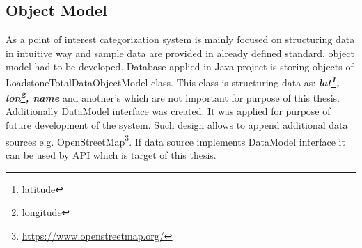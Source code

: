 \subsection{Object Model}
As a point of interest categorization system is mainly focused on structuring data in intuitive way and sample data are provided in already defined standard, object model had to be developed. Database applied in Java project is storing objects of LoadstoneTotalDataObjectModel class. This class is structuring data as: \textit{\textbf{lat\footnote{latitude}, lon\footnote{longitude}, name}} and another's which are not important for purpose of this thesis. Additionally DataModel interface was created. It was applied for purpose of future development of the system. Such design allows to append additional data sources e.g. OpenStreetMap\footnote{\url{https://www.openstreetmap.org/}}. If data source implements DataModel interface it can be used by API which is target of this thesis.      